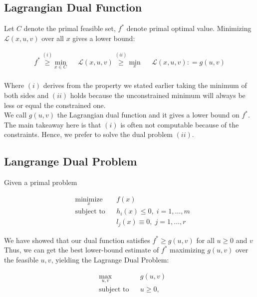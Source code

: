 \documentclass[twoside]{article}
\newcommand{\eqdef}{:\mathrel{\mathop=}}
\begin{document}
\newpage




\subsection{Lagrangian Dual Function}
Let $C$ denote the primal feasible set, $f^{*}$ denote primal optimal value. Minimizing $\mathcal{L}(x, u, v)$ over all $x$ gives a
lower bound:

\begin{equation*}
\begin{aligned}
f^{*} \overset{(i)}{\geq} \underset{x \in {C}}{\text{min}}& & \mathcal{L}(x, u, v) \overset{(ii)}{\geq} \underset{x}{\text{min}}& & \mathcal{L}(x, u, v)  \eqdef g(u,v)
\end{aligned}
\end{equation*}
\\

Where $(i)$ derives from the property we stated earlier taking the minimum of both sides and $(ii)$ holds because the unconstrained minimum will always be less or equal the constrained one. \\

We call $g(u,v)$ the Lagrangian dual function and it gives a lower bound on $f^{*}$. The main takeaway here is that $(i)$ is often not computable because of the constraints. Hence, we prefer to solve the dual problem $(ii)$.

\subsection{Langrange Dual Problem}
Given a primal problem 

\begin{equation*}
\begin{aligned}
& \underset{x}{\text{minimize}}
& & f(x) \\
& \text{subject to}
& & h_i(x) \leq 0, \; i = 1, \ldots, m \\
&&& l_j(x)\equiv 0, \; j = 1, \ldots, r
\end{aligned}
\end{equation*}

We have showed that our dual function satisfies $f^{*}  \geq g(u,v)$ for all $u \geq 0$ and $v$ \\
Thus, we can get the best lower-bound estimate of $f^{*}$ maximizing $g(u,v)$ over the feasible $u,v$, yielding the Lagrange Dual Problem:

\begin{equation*}
\begin{aligned}
& \underset{u,v}{\text{max}}
& & g(u,v) \\
& \text{subject to}
& & u \geq 0, \;
\end{aligned}
\end{equation*}\\
\end{document}
